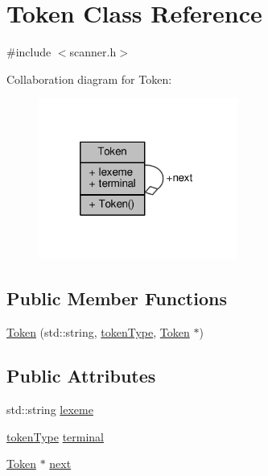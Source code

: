 \hypertarget{classToken}{\section{Token Class Reference}
\label{classToken}
}


{\ttfamily \#include $<$scanner.\-h$>$}



Collaboration diagram for Token\-:\nopagebreak
\begin{figure}[H]
\begin{center}
\leavevmode
\includegraphics[width=185pt]{classToken__coll__graph}
\end{center}
\end{figure}
\subsection*{Public Member Functions}
\begin{DoxyCompactItemize}
\item 
\hyperlink{classToken_a93748eebdfd09607d5170458c759d802}{Token} (std\-::string, \hyperlink{scanner_8h_ab7f9b765cab7ed98e5a7f05690f6a061}{token\-Type}, \hyperlink{classToken}{Token} $\ast$)
\end{DoxyCompactItemize}
\subsection*{Public Attributes}
\begin{DoxyCompactItemize}
\item 
std\-::string \hyperlink{classToken_abbff29ede445ed4a8520580f12490832}{lexeme}
\item 
\hyperlink{scanner_8h_ab7f9b765cab7ed98e5a7f05690f6a061}{token\-Type} \hyperlink{classToken_a11b4722b5e4023d234d2017126de378b}{terminal}
\item 
\hyperlink{classToken}{Token} $\ast$ \hyperlink{classToken_a32f24a25af788c192e5b387dc8d67914}{next}
\end{DoxyCompactItemize}


